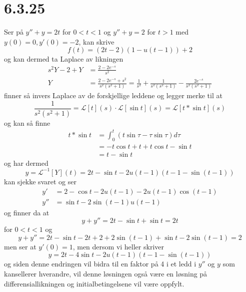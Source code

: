 \documentclass{report}
\newcommand{\nbrack}[1]{\left( #1 \right)}
\newcommand{\bbrack}[1]{\left[ #1 \right]}
\newcommand{\Lplc}[1]{\mathscr{L}\bbrack{ #1 } (s)}
\newcommand{\iLplc}[1]{\mathscr{L}^{-1}\bbrack{ #1 } (t)}
\begin{document}
\section*{6.3.25}
Ser på $y'' + y = 2t$ for $0<t<1$ og $y'' + y = 2$ for $t>1$ med $y(0) = 0, y'(0) = -2$, kan skrive
\begin{equation}
  \label{eq:27}
  f(t) = \nbrack{ 2t - 2 } \nbrack{ 1-u(t-1) } + 2
\end{equation}
og kan dermed ta Laplace av likningen
\begin{equation}
  \label{eq:28}
  \begin{split}
    s^{2} Y - 2 + Y &= \frac{2-2e^{-s}}{s^{2}} \\
    Y &= \frac{2-2e^{-s} + s^{2}}{s^{2}\nbrack{s^{2}+1}} = \frac{1}{s^{2}} + \frac{1}{s^{2}\nbrack{s^{2}+1}} - \frac{2e^{-s}}{s^{2} \nbrack{s^{2}+1}}
  \end{split}
\end{equation}
finner så invers Laplace av de forskjellige leddene og legger merke til at
\begin{equation}
  \label{eq:29}
  \frac{1}{s^{2} \nbrack{s^{2}+1}} = \Lplc{t} \cdot \Lplc{\sin t} = \Lplc{t*\sin t}
\end{equation}
og kan så finne
\begin{equation}
  \label{eq:30}
  \begin{split}
    t*\sin t &= \int_{0}^{t} \nbrack{t\sin \tau - \tau \sin\tau} d\tau \\
    &= -t \cos t + t + t\cos t - \sin t \\
    &= t - \sin t
  \end{split}
\end{equation}
og har dermed
\begin{equation}
  \label{eq:31}
  y = \iLplc{Y} = 2t - \sin t - 2u(t-1) \nbrack{ t - 1 - \sin \nbrack{t-1} }
\end{equation}
kan sjekke svaret og ser
\begin{equation}
  \label{eq:32}
  \begin{split}
    y' &= 2 - \cos t - 2u(t-1) - 2u(t-1) \cos (t-1) \\
    y'' &= \sin t - 2\sin(t-1)u(t-1)
  \end{split}
\end{equation}
og finner da at
\begin{equation}
  \label{eq:33}
  y + y'' = 2t - \sin t + \sin t = 2t
\end{equation}
for $0<t<1$ og
\begin{equation}
  \label{eq:34}
  y + y'' = 2t - \sin t - 2t + 2 + 2\sin (t-1) + \sin t - 2\sin(t-1) = 2
\end{equation}
men ser at $y'(0) = 1$, men dersom vi heller skriver
\begin{equation}
  \label{eq:35}
  y = 2t - 4\sin t - 2u(t-1) \nbrack{ t - 1 - \sin \nbrack{t-1} }
\end{equation}
og siden denne endringen vil bidra til en faktor på 4 i et ledd i $y''$ og $y$ som kansellerer hverandre, vil denne løsningen også være en løsning på differensiallikningen og initialbetingelsene vil være oppfylt. \\
\end{document}
